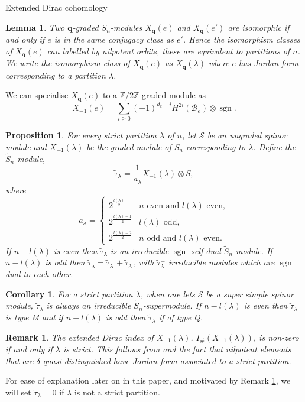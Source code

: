 \documentclass[a4paper,10pt]{amsart}
\newtheorem{corollary}[theorem]{Corollary}
\newtheorem{lemma}[theorem]{Lemma}
\newtheorem{proposition}[theorem]{Proposition}
\newtheorem{remark}[theorem]{Remark}
\DeclareMathOperator{\sgn}{sgn}
\begin{document}
\begin{section}{Extended Dirac cohomology}
\begin{lemma} \cite[2.2]{CG97}Two $\textbf{q}$-graded $S_n$-modules $X_{\textbf{q}}(e)$ and $X_{\textbf{q}}(e')$ are isomorphic if and only if $e$ is in the same conjugacy class as $e'$. Hence the isomorphism classes of $X_{\textbf{q}}(e)$ can labelled by nilpotent orbits, these are equivalent to partitions of $n$. 
We write the isomorphism class of $X_{\textbf{q}}(e)$ as $X_{\textbf{q}}(\lambda)$ where $e$ has Jordan form corresponding to a partition $\lambda$. \end{lemma} 
We can specialise $X_{\textbf{q}}(e)$ to a $\mathbb{Z}/2\mathbb{Z}$-graded module as 
$$X_{-1}(e)=  \sum_{i \geq 0} (-1)^{d_e - i} H^{2i}(\mathcal{B}_e) \otimes \sgn.$$




\begin{proposition}\cite[A.3]{CH15}\label{alambda}  For every strict partition $\lambda$ of $n$, let $\mathcal{S}$ be an ungraded spinor module and $X_{-1}(\lambda)$ be the graded module of $S_n$ corresponding to $\lambda$.  Define the $\tilde{S}_n$-module,
$$\tilde{\tau}_\lambda = \frac{1}{a_\lambda} X_{-1}(\lambda) \otimes S,$$ 
where 
$$a_\lambda = \begin{cases} 2^{\frac{l(\lambda)}{2}} & n \text{ even and } l(\lambda) \text{ even}, \\ 2^{\frac{l(\lambda)-1}{2}} & l(\lambda) \text{ odd}, \\ 2^{\frac{l(\lambda)-2}{2}} & n \text{ odd and } l(\lambda) \text{ even}. \end{cases}$$
If $n-l(\lambda)$ is even then $\tilde{\tau}_\lambda$ is an irreducible $\sgn$ self-dual $\tilde{S}_n$-module. If $n-l(\lambda)$ is odd then $\tilde{\tau}_\lambda = \tilde{\tau}^+_\lambda + \tilde{\tau}^-_\lambda$, with $\tilde{\tau}^\pm_\lambda$ irreducible modules which are $\sgn$ dual to each other. \end{proposition} 


\begin{corollary} For a strict partition $\lambda$, when one lets $\mathcal{S}$ be a super simple spinor module, $\tilde{\tau}_\lambda$ is always an irreducible $\tilde{S}_n$-supermodule. If $n-l(\lambda)$ is even then $\tilde{\tau}_\lambda$ is type M and if $n-l(\lambda)$ is odd then $\tilde{\tau}_\lambda$ if of type Q. \end{corollary} 


\begin{remark}\label{indexkilled} The extended Dirac index of $X_{-1}(\lambda)$, $I_\#(X_{-1}(\lambda))$,  is non-zero if and only if $\lambda$ is strict. This follows from  \cite[6.1]{CH15} and the fact that nilpotent elements that are $\delta$ quasi-distinguished have Jordan form associated to a strict partition.\end{remark}  
For ease of explanation later on in this paper, and motivated by Remark \ref{indexkilled}, we will set $\tilde{\tau}_\lambda = 0$ if $\lambda$ is not a strict partition.


\end{section}
\end{document}
